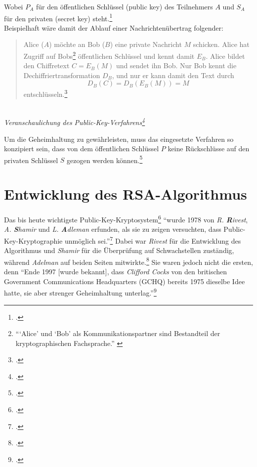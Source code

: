 \documentclass{scrarticle}
\begin{document}
        Wobei $P_A$ für den öffentlichen Schlüssel (public key) des Teilnehmers $A$ und $S_A$ für den privaten (secret key) steht.\footcite[vgl.][21f.]{ertel2003}\\
        Beispielhaft wäre damit der Ablauf einer Nachrichtenübertrag folgender:
        \begin{quote}
            Alice ($A$) möchte an Bob ($B$) eine private Nachricht $M$ schicken. Alice hat Zugriff auf Bobs\footnote{\enquote{\enquote*{Alice} und \enquote*{Bob} als Kommunikationspartner sind Bestandteil der kryptographischen Fachsprache.} \cite[21]{ertel2003}} öffentlichen Schlüssel und kennt damit $E_B$. Alice bildet den Chiffretext $C = E_B(M)$ und sendet ihn Bob. Nur Bob kennt die Dechiffriertransformation $D_B$, und nur er kann damit den Text durch
            \begin{equation*}
                D_B(C) = D_B(E_B(M)) = M
            \end{equation*}
            entschlüsseln.\footcite[vgl.][68]{watjen2008}
        \end{quote}
        \begin{center}
            \\
            \emph{Veranschaulichung des Public-Key-Verfahrens\footcite[67]{watjen2008}}\\            
        \end{center}
        Um die Geheimhaltung zu gewährleisten, muss das eingesetzte Verfahren so konzipiert sein, dass von dem öffentlichen Schlüssel $P$ keine Rückschlüsse auf den privaten Schlüssel $S$ gezogen werden können.\footcite[33]{beutelspacher2015}
    
    \section{Entwicklung des RSA-Algorithmus}
        Das bis heute wichtigste Public-Key-Kryptosystem\footcite[vgl.][26]{pieprzyk2010topics} \enquote{wurde 1978 von \emph{R. \textbf{R}ivest},\\ \emph{A. \textbf{S}hamir} und \emph{L. \textbf{A}dleman} erfunden, als sie zu zeigen versuchten, dass Public-Key-Kryptographie unmöglich sei.}\footcite[43]{beutelspacher2015} Dabei war \emph{Rivest} für die Entwicklung des Algorithmus und \emph{Shamir} für die Überprüfung auf Schwachstellen zuständig, während \emph{Adelman} auf beiden Seiten mitwirkte.\footcite[77]{ertel2003} Sie waren jedoch nicht die ersten, denn \enquote{Ende 1997 [wurde bekannt], dass \emph{Clifford Cocks} von den britischen Government Communications Headquarters (GCHQ) bereits 1975 dieselbe Idee hatte, sie aber strenger Geheimhaltung unterlag.}\footcite[71]{watjen2008}
    
\end{document}
